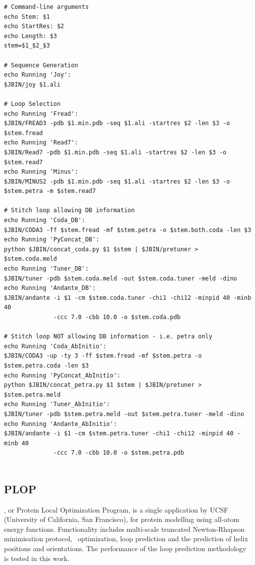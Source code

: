 \begin{lstlisting}[float, caption={An excerpt from the launch script created for \textsc{Orchestrar} during this work.}, label=listing:methcomp:orchestrar]
# Command-line arguments
echo Stem: $1
echo StartRes: $2
echo Length: $3
stem=$1_$2_$3

# Sequence Generation
echo Running 'Joy':
$JBIN/joy $1.ali

# Loop Selection
echo Running 'Fread':
$JBIN/FREAD3 -pdb $1.min.pdb -seq $1.ali -startres $2 -len $3 -o $stem.fread
echo Running 'Read7':
$JBIN/Read7 -pdb $1.min.pdb -seq $1.ali -startres $2 -len $3 -o $stem.read7
echo Running 'Minus':
$JBIN/MINUS2 -pdb $1.min.pdb -seq $1.ali -startres $2 -len $3 -o $stem.petra -m $stem.read7

# Stitch loop allowing DB information
echo Running 'Coda_DB':
$JBIN/CODA3 -ff $stem.fread -mf $stem.petra -o $stem.both.coda -len $3
echo Running 'PyConcat_DB':
python $JBIN/concat_coda.py $1 $stem | $JBIN/pretuner > $stem.coda.meld
echo Running 'Tuner_DB':
$JBIN/tuner -pdb $stem.coda.meld -out $stem.coda.tuner -meld -dino 
echo Running 'Andante_DB':
$JBIN/andante -i $1 -cm $stem.coda.tuner -chi1 -chi12 -minpid 40 -minb 40
              -ccc 7.0 -cbb 10.0 -o $stem.coda.pdb

# Stitch loop NOT allowing DB information - i.e. petra only
echo Running 'Coda_AbInitio':
$JBIN/CODA3 -up -ty 3 -ff $stem.fread -mf $stem.petra -o $stem.petra.coda -len $3
echo Running 'PyConcat_AbInitio':
python $JBIN/concat_petra.py $1 $stem | $JBIN/pretuner > $stem.petra.meld 
echo Running 'Tuner_AbInitio':
$JBIN/tuner -pdb $stem.petra.meld -out $stem.petra.tuner -meld -dino 
echo Running 'Andante_AbInitio':
$JBIN/andante -i $1 -cm $stem.petra.tuner -chi1 -chi12 -minpid 40 -minb 40
              -ccc 7.0 -cbb 10.0 -o $stem.petra.pdb
              
\end{lstlisting}



\subsection{PLOP}

\plop, or Protein Local Optimization Program, is a single application by UCSF (University of California, San Francisco), for protein modelling using all-atom energy functions. Functionality includes multi-scale truncated Newton-Rhapson minimisation protocol, \sidechain\ optimization\cite{METHOD:Plop:Jacobson2002A,METHOD:Plop:Jacobson2002B}, loop prediction\cite{METHOD:Plop} and the prediction of helix positions and orientations\cite{METHOD:Plop:Xin2004}. The performance of the loop prediction methodology is tested in this work. 

